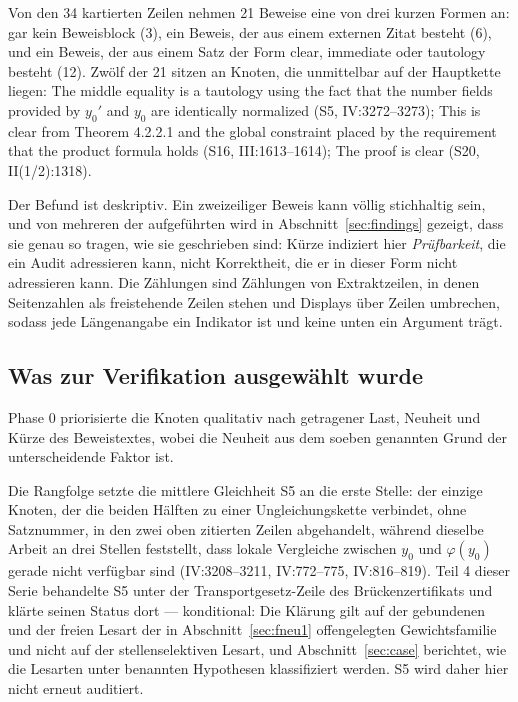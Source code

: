 \documentclass[11pt,a4paper]{article}
\theoremstyle{definition}
\theoremstyle{remark}
\begin{document}
Von den 34 kartierten Zeilen nehmen 21 Beweise eine von drei kurzen Formen
an: gar kein Beweisblock (3), ein Beweis, der aus einem externen Zitat
besteht (6), und ein Beweis, der aus einem Satz der Form \glqq clear\grqq{},
\glqq immediate\grqq{} oder \glqq tautology\grqq{} besteht (12). Zwölf der 21 sitzen an
Knoten, die unmittelbar auf der Hauptkette liegen: \glqq The middle equality is
a tautology using the fact that the number fields provided by $y_0'$ and
$y_0$ are identically normalized\grqq{} (S5, IV:3272--3273); \glqq This is clear from
Theorem 4.2.2.1 and the global constraint placed by the requirement that the
product formula holds\grqq{} (S16, III:1613--1614); \glqq The proof is clear\grqq{} (S20,
II(1/2):1318).

Der Befund ist deskriptiv. Ein zweizeiliger Beweis kann völlig stichhaltig
sein, und von mehreren der aufgeführten wird in
Abschnitt~\ref{sec:findings} gezeigt, dass sie genau so tragen, wie sie
geschrieben sind: Kürze indiziert hier \emph{Prüfbarkeit}, die ein Audit
adressieren kann, nicht Korrektheit, die er in dieser Form nicht adressieren
kann. Die Zählungen sind Zählungen von Extraktzeilen, in denen Seitenzahlen
als freistehende Zeilen stehen und Displays über Zeilen umbrechen, sodass
jede Längenangabe ein Indikator ist und keine unten ein Argument trägt.

\subsection{Was zur Verifikation ausgewählt wurde}

Phase 0 priorisierte die Knoten qualitativ nach getragener Last, Neuheit und
Kürze des Beweistextes, wobei die Neuheit aus dem soeben genannten Grund der
unterscheidende Faktor ist.

Die Rangfolge setzte die mittlere Gleichheit S5 an die erste Stelle: der
einzige Knoten, der die beiden Hälften zu einer Ungleichungskette verbindet,
ohne Satznummer, in den zwei oben zitierten Zeilen abgehandelt, während
dieselbe Arbeit an drei Stellen feststellt, dass lokale Vergleiche zwischen
$y_0$ und $\varphi(y_0)$ gerade nicht verfügbar sind (IV:3208--3211,
IV:772--775, IV:816--819). Teil 4 dieser Serie behandelte S5 unter der
Transportgesetz-Zeile des Brückenzertifikats und klärte seinen Status dort
--- konditional: Die Klärung gilt auf der gebundenen und der freien Lesart
der in Abschnitt~\ref{sec:fneu1} offengelegten Gewichtsfamilie und nicht auf
der stellenselektiven Lesart, und Abschnitt~\ref{sec:case} berichtet, wie
die Lesarten unter benannten Hypothesen klassifiziert werden. S5 wird daher
hier nicht erneut auditiert.
\end{document}
